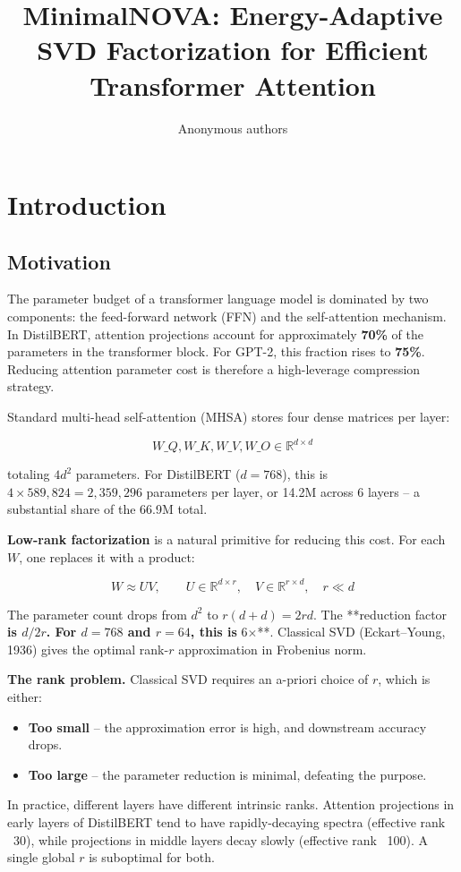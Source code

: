 \title{\textbf{MinimalNOVA: Energy-Adaptive SVD Factorization for Efficient Transformer Attention}}

\author{Anonymous authors}



\section{Introduction}

\subsection{Motivation}

The parameter budget of a transformer language model is dominated by two 
components: the feed-forward network (FFN) and the self-attention mechanism. 
In DistilBERT, attention projections account for approximately \textbf{70\%} of the 
parameters in the transformer block. For GPT-2, this fraction rises to 
\textbf{75\%}. Reducing attention parameter cost is therefore a high-leverage 
compression strategy.

Standard multi-head self-attention (MHSA) stores four dense matrices per 
layer:

\[
W\_Q, W\_K, W\_V, W\_O \in \mathbb{R}^{d \times d}
\tag{1.1}
\]

totaling $4d^2$ parameters. For DistilBERT ($d = 768$), this is $4 \times 589{,}824 = 2{,}359{,}296$ 
parameters per layer, or 14.2M across 6 layers -- a substantial share of the 
66.9M total.

\textbf{Low-rank factorization} is a natural primitive for reducing this cost. 
For each $W$, one replaces it with a product:

\[
W \approx U V, \qquad
U \in \mathbb{R}^{d \times r}, \quad V \in \mathbb{R}^{r \times d}, \quad r \ll d
\tag{1.2}
\]

The parameter count drops from $d^2$ to $r(d + d) = 2rd$. The **reduction 
factor\textbf{ is $d / 2r$. For $d = 768$ and $r = 64$, this is }6$\times$**. Classical 
SVD (Eckart--Young, 1936) gives the optimal rank-$r$ approximation in 
Frobenius norm.

\textbf{The rank problem.} Classical SVD requires an a-priori choice of $r$, which 
is either:

\begin{itemize}
\item \textbf{Too small} -- the approximation error is high, and downstream accuracy
  drops.
\item \textbf{Too large} -- the parameter reduction is minimal, defeating the purpose.

\end{itemize}
In practice, different layers have different intrinsic ranks. Attention 
projections in early layers of DistilBERT tend to have rapidly-decaying 
spectra (effective rank ~30), while projections in middle layers decay 
slowly (effective rank ~100). A single global $r$ is suboptimal for both.

